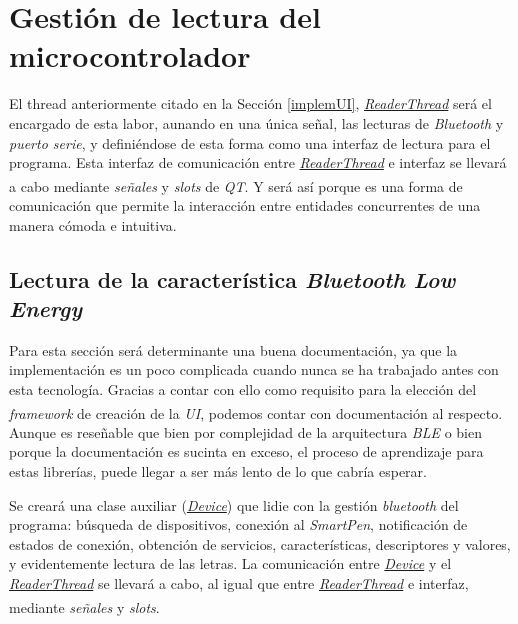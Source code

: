 \section{Gestión de lectura del microcontrolador}
El thread anteriormente citado en la Sección \ref{implemUI},
\href{https://github.com/AntonioPriego/SmartPen/blob/main/SmartPenUI/readerthread.cpp}{\textit{ReaderThread}}
será el encargado de esta labor, aunando en una única señal, las lecturas
de \textit{Bluetooth} y \textit{puerto serie}, y definiéndose de esta forma
como una interfaz de lectura para el programa. Esta interfaz de comunicación
entre 
\href{https://github.com/AntonioPriego/SmartPen/blob/main/SmartPenUI/readerthread.cpp}{\textit{ReaderThread}}
e interfaz se llevará a cabo mediante \textit{señales} y
\textit{slots}\textsuperscript{\cite{signalsQT}}
de \textit{QT}. Y será así porque es una forma de comunicación que permite
la interacción entre entidades concurrentes de una manera cómoda e intuitiva.


\subsection{Lectura de la característica \textit{Bluetooth Low Energy}}
Para esta sección será determinante una buena documentación, ya que la
implementación es un poco complicada cuando nunca se ha trabajado antes
con esta tecnología. Gracias a contar con ello como requisito para
la elección del \textit{framework} de creación de la \textit{UI},
podemos contar con documentación al respecto\textsuperscript{\cite{ejBLE}}.
Aunque es reseñable que bien por complejidad de la arquitectura \textit{BLE}
o bien porque la documentación es sucinta en exceso, el proceso de aprendizaje
para estas librerías, puede llegar a ser más lento de lo que cabría esperar.

Se creará una clase auxiliar
(\href{https://github.com/AntonioPriego/SmartPen/blob/main/SmartPenUI/device.cpp}{\textit{Device}})
que lidie con la gestión \textit{bluetooth} del programa: búsqueda de
dispositivos, conexión al \textit{SmartPen}, notificación de estados de conexión,
obtención de servicios, características, descriptores y valores,
y evidentemente lectura de las letras. La comunicación entre 
\href{https://github.com/AntonioPriego/SmartPen/blob/main/SmartPenUI/device.cpp}{\textit{Device}}
y el
\href{https://github.com/AntonioPriego/SmartPen/blob/main/SmartPenUI/readerthread.cpp}{\textit{ReaderThread}}
se llevará a cabo, al igual que entre
\href{https://github.com/AntonioPriego/SmartPen/blob/main/SmartPenUI/readerthread.cpp}{\textit{ReaderThread}}
e interfaz, mediante \textit{señales} y \textit{slots}\textsuperscript{\cite{signalsQT}}.

